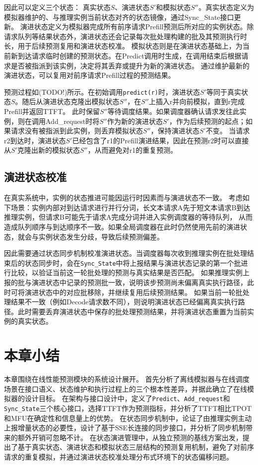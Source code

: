 因此可以定义三个状态：
真实状态\(S\)、演进状态\(S'\)和模拟状态\(S''\)。真实状态定义为模拟器维护的、与推理实例当前状态对齐的状态镜像，通过Sync\_State接口更新。
演进状态定义为模拟器完成所有前序请求Prefill预测后所对应的实例状态。除请求队列等结果状态外，演进状态还会记录每次批处理构建的批及其预测执行时长，用于后续预测复用和演进状态校准。
模拟状态则是在演进状态基础上，为当前新到达请求临时创建的预测状态。在Predict调用时生成，在调用结束后根据请求是否被指派到该实例，决定将其丢弃或提升为新的演进状态。
通过维护最新的演进状态，可以复用对前序请求Prefill过程的预测结果。

预测过程如(TODO!)所示。在初始调用\texttt{predict(r)}时，演进状态\(S'\)等同于真实状态\(S\)。随后从演进状态克隆出模拟状态\(S''\)，在\(S''\)上插入r并向前模拟，直到r完成Prefill并返回TTFT。
此时保留\(S''\)等待调度结果。如果调度器确认请求发往此实例，则在调用Add\_request时将\(S''\)作为新的演进状态\(S'\)，作为后续预测的起点；如果请求没有被指派到此实例，则丢弃模拟状态\(S''\)，保持演进状态\(S'\)不变。
当请求r2到达时，演进状态\(S'\)已经包含了r1的Prefill演进结果，因此在预测r2时可以直接从\(S'\)克隆出新的模拟状态\(S''\)，从而避免对r1的重复预测。

\subsection{演进状态校准}
在真实系统中，实例的状态推进可能因运行时因素而与演进状态不一致。
考虑如下场景：实例内部对到达请求进行并行分词，长文本请求A先于短文本请求B到达推理实例，但请求B可能先于请求A完成分词并进入实例调度器的等待队列，
从而造成队列顺序与到达顺序不一致。如果全局调度器在此时仍然使用先前的演进状态，就会与实例状态发生分歧，导致后续预测偏差。

因此需要通过状态同步机制校准演进状态。当调度器每次收到推理实例在批处理结束后的状态同步时，会在\texttt{Sync\_State}中将上报结果与演进状态记录的第一个批进行比较，以验证当前这一轮批处理的预测与真实结果是否匹配。
如果推理实例上报的批与演进状态中记录的预测批一致，说明该步预测尚未偏离真实执行路径，此时可将演进状态中的对应批移除，并继续复用后续预测结果。
如果当前一轮批处理结果不一致（例如Decode请求数不同），则说明演进状态已经偏离真实执行路径。此时需要丢弃演进状态中保存的批处理预测结果，并将演进状态重置为当前实例的真实状态。

\section{本章小结}
本章围绕在线性能预测模块的系统设计展开。
首先分析了离线模拟器与在线调度场景在接口语义、状态维护和执行过程上的三个根本性差异，并据此确立了在线模拟器的设计目标。
在架构与接口设计中，定义了\texttt{Predict}、\texttt{Add\_request}和\texttt{Sync\_State}三个核心接口，选择TTFT作为预测指标，并分析了TTFT相比TPOT和MFU在确定性和信息量上的优势。
在状态同步机制中，论证了由推理实例主动上报增量状态的必要性，设计了基于SSE长连接的同步接口，并分析了同步机制带来的额外开销可忽略不计。
在状态演进管理中，从独立预测的基线方案出发，提出了基于真实状态、演进状态和模拟状态三层结构的预测复用机制，避免了对前序请求的重复模拟，并通过演进状态校准处理分布式环境下的状态偏移问题。
